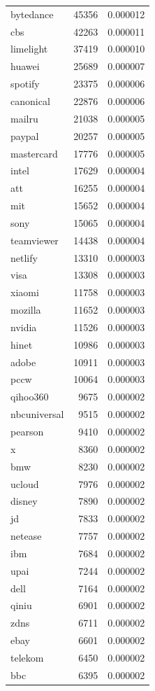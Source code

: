 \begin{tabular}{lrr}
bytedance & 45356 & 0.000012 \\
cbs & 42263 & 0.000011 \\
limelight & 37419 & 0.000010 \\
huawei & 25689 & 0.000007 \\
spotify & 23375 & 0.000006 \\
canonical & 22876 & 0.000006 \\
mailru & 21038 & 0.000005 \\
paypal & 20257 & 0.000005 \\
mastercard & 17776 & 0.000005 \\
intel & 17629 & 0.000004 \\
att & 16255 & 0.000004 \\
mit & 15652 & 0.000004 \\
sony & 15065 & 0.000004 \\
teamviewer & 14438 & 0.000004 \\
netlify & 13310 & 0.000003 \\
visa & 13308 & 0.000003 \\
xiaomi & 11758 & 0.000003 \\
mozilla & 11652 & 0.000003 \\
nvidia & 11526 & 0.000003 \\
hinet & 10986 & 0.000003 \\
adobe & 10911 & 0.000003 \\
pccw & 10064 & 0.000003 \\
qihoo360 & 9675 & 0.000002 \\
nbcuniversal & 9515 & 0.000002 \\
pearson & 9410 & 0.000002 \\
x & 8360 & 0.000002 \\
bmw & 8230 & 0.000002 \\
ucloud & 7976 & 0.000002 \\
disney & 7890 & 0.000002 \\
jd & 7833 & 0.000002 \\
netease & 7757 & 0.000002 \\
ibm & 7684 & 0.000002 \\
upai & 7244 & 0.000002 \\
dell & 7164 & 0.000002 \\
qiniu & 6901 & 0.000002 \\
zdns & 6711 & 0.000002 \\
ebay & 6601 & 0.000002 \\
telekom & 6450 & 0.000002 \\
bbc & 6395 & 0.000002 \\

\end{tabular}
